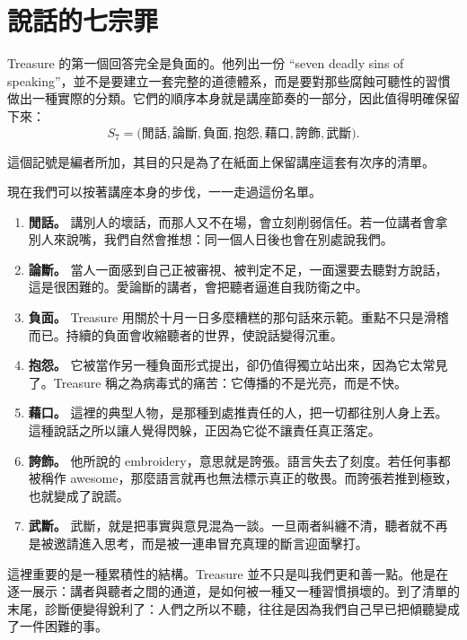 \section{說話的七宗罪}

Treasure 的第一個回答完全是負面的。他列出一份 ``seven deadly sins of speaking''，並不是要建立一套完整的道德體系，而是要對那些腐蝕可聽性的習慣做出一種實際的分類。它們的順序本身就是講座節奏的一部分，因此值得明確保留下來：
\begin{equation}
S_7=
\bigl(
\text{閒話},
\text{論斷},
\text{負面},
\text{抱怨},
\text{藉口},
\text{誇飾},
\text{武斷}
\bigr).
\end{equation}

\begin{remark}
這個記號是編者所加，其目的只是為了在紙面上保留講座這套有次序的清單。
\end{remark}

現在我們可以按著講座本身的步伐，一一走過這份名單。

\begin{enumerate}
\item \textbf{閒話。} 講別人的壞話，而那人又不在場，會立刻削弱信任。若一位講者會拿別人來說嘴，我們自然會推想：同一個人日後也會在別處說我們。
\item \textbf{論斷。} 當人一面感到自己正被審視、被判定不足，一面還要去聽對方說話，這是很困難的。愛論斷的講者，會把聽者逼進自我防衛之中。
\item \textbf{負面。} Treasure 用關於十月一日多麼糟糕的那句話來示範。重點不只是滑稽而已。持續的負面會收縮聽者的世界，使說話變得沉重。
\item \textbf{抱怨。} 它被當作另一種負面形式提出，卻仍值得獨立站出來，因為它太常見了。Treasure 稱之為病毒式的痛苦：它傳播的不是光亮，而是不快。
\item \textbf{藉口。} 這裡的典型人物，是那種到處推責任的人，把一切都往別人身上丟。這種說話之所以讓人覺得閃躲，正因為它從不讓責任真正落定。
\item \textbf{誇飾。} 他所說的 embroidery，意思就是誇張。語言失去了刻度。若任何事都被稱作 awesome，那麼語言就再也無法標示真正的敬畏。而誇張若推到極致，也就變成了說謊。
\item \textbf{武斷。} 武斷，就是把事實與意見混為一談。一旦兩者糾纏不清，聽者就不再是被邀請進入思考，而是被一連串冒充真理的斷言迎面擊打。
\end{enumerate}

這裡重要的是一種累積性的結構。Treasure 並不只是叫我們更和善一點。他是在逐一展示：講者與聽者之間的通道，是如何被一種又一種習慣損壞的。到了清單的末尾，診斷便變得銳利了：人們之所以不聽，往往是因為我們自己早已把傾聽變成了一件困難的事。

